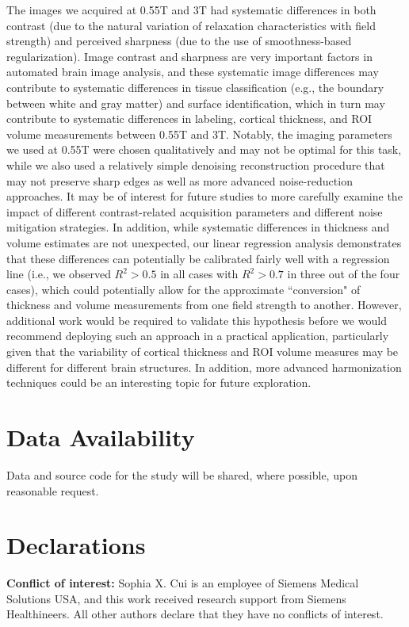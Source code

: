 \documentclass[12pt,letterpaper,onecolumn]{article}
\begin{document}
The images we acquired at 0.55T and 3T had {systematic differences in both contrast (due to the natural variation of relaxation characteristics with field strength) and perceived sharpness (due to the use of smoothness-based regularization). Image contrast and sharpness are very important factors in automated brain image analysis, and these systematic image differences  may contribute to systematic differences in tissue classification (e.g., the boundary between white and gray matter) and surface identification, which in turn may contribute to systematic differences in labeling, cortical thickness, and ROI volume measurements between 0.55T and 3T. Notably, the imaging parameters we used at 0.55T were chosen qualitatively and may not be optimal for this task, while we also used a relatively simple denoising reconstruction procedure that may not preserve sharp edges as well as more advanced noise-reduction approaches. It may be of interest for future studies to more carefully examine the impact of different contrast-related acquisition parameters and different noise mitigation strategies.}  In addition, while systematic differences in thickness and volume estimates are not unexpected, our linear regression analysis demonstrates that these differences can {potentially} be calibrated fairly well with a regression line {(i.e., we observed $R^2>0.5$ in all cases with $R^2>0.7$ in three out of the four cases)}, which could potentially allow for the approximate ``conversion" of thickness and volume measurements from one field strength to another. { \textcolor{.}{However,  additional work would be required to validate this hypothesis before we would recommend deploying such an approach in a practical application, particularly given that the variability of cortical thickness and ROI volume measures may be different for different brain structures.} In addition, more advanced harmonization techniques could be an interesting topic for future exploration.}


\section*{Data Availability}  
Data and source code for the study will be shared, where possible,  upon reasonable request.  

\section*{Declarations}
\textbf{Conflict of interest:} Sophia X. Cui is an employee of Siemens Medical Solutions USA, and this work received research support from Siemens Healthineers.
All other authors declare that they have no conflicts of interest. 
\end{document}
